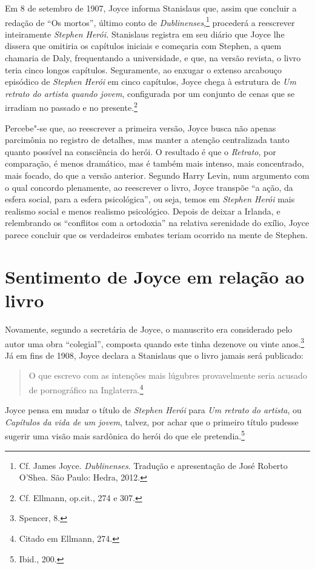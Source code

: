 Em 8 de setembro de 1907, Joyce informa Stanislaus que, assim que
concluir a redação de “Os mortos”, último conto de \textit{Dublinenses},\footnote{ Cf. James Joyce. 
\textit{Dublinenses}. Tradução e apresentação de José Roberto O'Shea. São Paulo: Hedra, 2012.} 
procederá a reescrever inteiramente
\textit{Stephen Herói.}  Stanislaus registra em seu diário que Joyce
lhe dissera que omitiria os capítulos iniciais e começaria com Stephen,
a quem chamaria de Daly, frequentando a universidade, e que, na versão
revista, o livro teria cinco longos capítulos.  Seguramente, ao enxugar
o extenso arcabouço episódico de \textit{Stephen Herói} em cinco
capítulos, Joyce chega à estrutura de \textit{Um retrato do artista
quando jovem}, configurada por um conjunto de cenas que se irradiam no
passado e no presente.\footnote{ Cf. Ellmann, op.cit., 274 e 307.}

Percebe"-se que, ao reescrever a primeira versão, Joyce busca não
apenas parcimônia no registro de detalhes, mas manter a atenção centralizada
tanto quanto possível na consciência do herói.  O resultado é que o
\textit{Retrato}, por comparação, é menos dramático, mas é também mais
intenso, mais concentrado, mais focado, do que a versão anterior. 
Segundo Harry Levin, num argumento com o qual concordo plenamente, ao
reescrever o livro, Joyce transpõe “a ação, da esfera social, para a
esfera psicológica”, ou seja, temos em \textit{Stephen Herói} mais	
realismo social e menos realismo psicológico.  Depois de deixar a
Irlanda, e relembrando os “conflitos com a ortodoxia” na relativa
serenidade do exílio, Joyce parece concluir que os verdadeiros embates
teriam ocorrido na mente de Stephen.


\section*{Sentimento de Joyce em relação ao livro}

Novamente, segundo a secretária de Joyce, o manuscrito era considerado
pelo autor uma obra “colegial”, composta quando este tinha dezenove ou
vinte anos.\footnote{ Spencer, 8.}  Já em fins de 1908, Joyce declara a Stanislaus		
que o livro jamais será publicado: 

\begin{quote}
O que escrevo com as intenções mais
lúgubres provavelmente seria acusado de pornográfico na Inglaterra.\footnote{			
Citado em Ellmann, 274.} 
\end{quote}

Joyce pensa em mudar o título de
\textit{Stephen Herói} para \textit{Um retrato do artista}, ou
\textit{Capítulos da vida de um jovem}, talvez, por achar que o
primeiro título pudesse sugerir uma visão mais sardônica do herói do
que ele pretendia.\footnote{ Ibid., 200.}					

